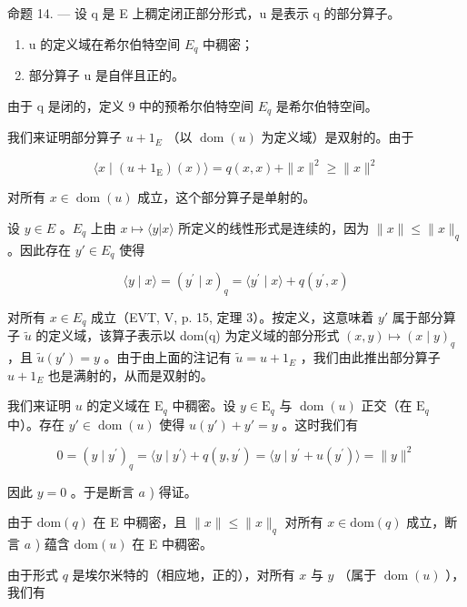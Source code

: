 命题 14. --- 设 q 是 E 上稠定闭正部分形式，u 是表示 q 的部分算子。

\begin{enumerate}
\def\labelenumi{\alph{enumi})}
\item
  u 的定义域在希尔伯特空间 \(E_{q}\) 中稠密；
\item
  部分算子 u 是自伴且正的。
\end{enumerate}

由于 q 是闭的，定义 9 中的预希尔伯特空间 \(E_{q}\) 是希尔伯特空间。

我们来证明部分算子 \(u + 1_{E}\) （以 \(\operatorname{dom}(u)\) 为定义域）是双射的。由于

\[
\langle x \mid (u + 1 _ {\mathrm{E}}) (x) \rangle = q (x, x) + \| x \| ^ {2} \geqslant \| x \| ^ {2}
\]

对所有 \(x \in \operatorname{dom}(u)\) 成立，这个部分算子是单射的。

设 \(y \in E\) 。\(E_{q}\) 上由 \(x \mapsto \langle y | x \rangle\) 所定义的线性形式是连续的，因为 \(\|x\| \leqslant \|x\|_{q}\) 。因此存在 \(y' \in E_{q}\) 使得

\[
\langle y \mid x \rangle = (y ^ {\prime} \mid x) _ {q} = \langle y ^ {\prime} \mid x \rangle + q (y ^ {\prime}, x)
\]

对所有 \(x \in E_{q}\) 成立（EVT, V, p. 15, 定理 3）。按定义，这意味着 \(y'\) 属于部分算子 \(\widetilde{u}\) 的定义域，该算子表示以 dom(q) 为定义域的部分形式 \((x, y) \mapsto (x \mid y)_{q}\) ，且 \(\widetilde{u}(y') = y\) 。由于由上面的注记有 \(\widetilde{u} = u + 1_{E}\) ，我们由此推出部分算子 \(u + 1_{E}\) 也是满射的，从而是双射的。

我们来证明 \(u\) 的定义域在 \(\mathrm{E}_q\) 中稠密。设 \(y \in \mathrm{E}_q\) 与 \(\operatorname{dom}(u)\) 正交（在 \(\mathrm{E}_q\) 中）。存在 \(y' \in \operatorname{dom}(u)\) 使得 \(u(y') + y' = y\) 。这时我们有

\[
0 = (y \mid y ^ {\prime}) _ {q} = \langle y \mid y ^ {\prime} \rangle + q (y, y ^ {\prime}) = \langle y \mid y ^ {\prime} + u (y ^ {\prime}) \rangle = \| y \| ^ {2}
\]

因此 \(y = 0\) 。于是断言 \(a\) ) 得证。

由于 \(\mathrm{dom}(q)\) 在 E 中稠密，且 \(\| x\| \leqslant \| x\| _q\) 对所有 \(x\in \mathrm{dom}(q)\) 成立，断言 \(a\) ) 蕴含 \(\mathrm{dom}(u)\) 在 E 中稠密。

由于形式 \(q\) 是埃尔米特的（相应地，正的），对所有 \(x\) 与 \(y\) （属于 \(\operatorname{dom}(u)\) ），我们有

